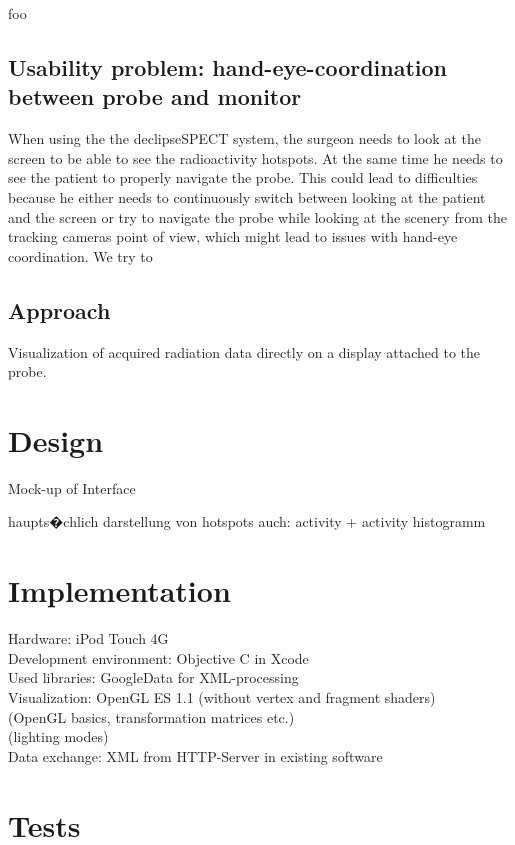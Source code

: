 \documentclass{scrartcl}
\begin{document}
foo
\subsection{Usability problem: hand-eye-coordination between probe and monitor}


When using the the declipseSPECT system, the surgeon needs to look at the screen to be able to see the radioactivity hotspots. At the same time he needs to see the patient to properly navigate the probe. This could lead to difficulties because he either needs to continuously switch between looking at the patient and the screen or try to navigate the probe while looking at the scenery from the tracking cameras point of view, which might lead to issues with hand-eye coordination.
We try to 

\subsection{Approach}
Visualization of acquired radiation data directly on a display attached to the probe.

\section{Design}

Mock-up of Interface

haupts�chlich darstellung von hotspots
auch: activity + activity histogramm

\section{Implementation}

Hardware: iPod Touch 4G\\
Development environment: Objective C in Xcode\\
Used libraries: GoogleData for XML-processing\\
Visualization: OpenGL ES 1.1 (without vertex and fragment shaders)\\
(OpenGL basics, transformation matrices etc.)\\
(lighting modes)\\
Data exchange: XML from HTTP-Server in existing software\\

\section{Tests}
\end{document}
